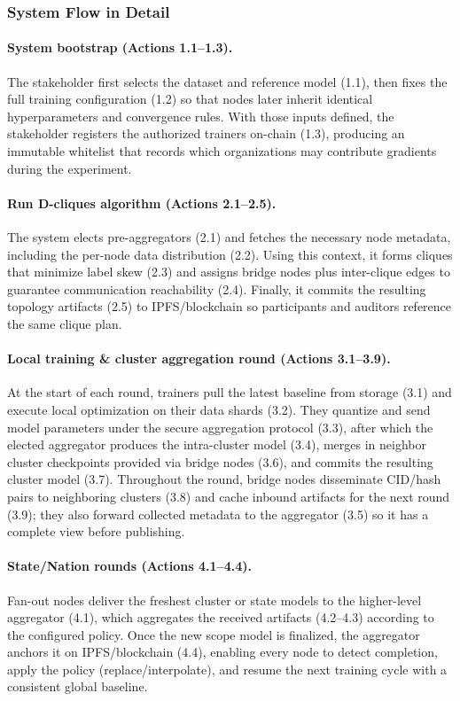 
\subsubsection{System Flow in Detail}
\label{sec:system-flow-detail}

\paragraph{System bootstrap (Actions 1.1--1.3).} The stakeholder first selects the dataset and reference model (1.1), then fixes the full training configuration (1.2) so that nodes later inherit identical hyperparameters and convergence rules. With those inputs defined, the stakeholder registers the authorized trainers on-chain (1.3), producing an immutable whitelist that records which organizations may contribute gradients during the experiment.

\paragraph{Run D-cliques algorithm (Actions 2.1--2.5).} The system elects pre-aggregators (2.1) and fetches the necessary node metadata, including the per-node data distribution (2.2). Using this context, it forms cliques that minimize label skew (2.3) and assigns bridge nodes plus inter-clique edges to guarantee communication reachability (2.4). Finally, it commits the resulting topology artifacts (2.5) to IPFS/blockchain so participants and auditors reference the same clique plan.

\paragraph{Local training \& cluster aggregation round (Actions 3.1--3.9).} At the start of each round, trainers pull the latest baseline from storage (3.1) and execute local optimization on their data shards (3.2). They quantize and send model parameters under the secure aggregation protocol (3.3), after which the elected aggregator produces the intra-cluster model (3.4), merges in neighbor cluster checkpoints provided via bridge nodes (3.6), and commits the resulting cluster model (3.7). Throughout the round, bridge nodes disseminate CID/hash pairs to neighboring clusters (3.8) and cache inbound artifacts for the next round (3.9); they also forward collected metadata to the aggregator (3.5) so it has a complete view before publishing.

\paragraph{State/Nation rounds (Actions 4.1--4.4).} Fan-out nodes deliver the freshest cluster or state models to the higher-level aggregator (4.1), which aggregates the received artifacts (4.2--4.3) according to the configured policy. Once the new scope model is finalized, the aggregator anchors it on IPFS/blockchain (4.4), enabling every node to detect completion, apply the policy (replace/interpolate), and resume the next training cycle with a consistent global baseline.
